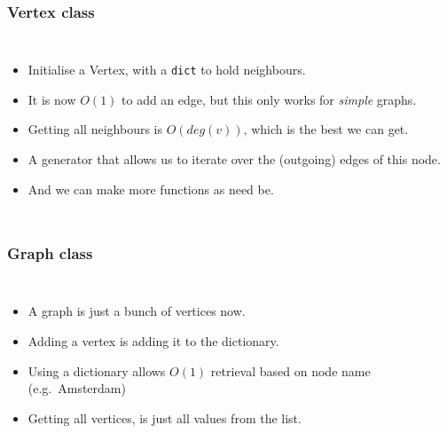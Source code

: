 \begin{frame}
	\frametitle{Vertex class}
	
	\begin{columns}
			
		\begin{itemize}
			\pause
			\item Initialise a Vertex, with a \texttt{dict} to hold neighbours.
				\pause
			\item It is now $O(1)$ to add an edge, but this only works for \textit{simple} graphs.
				\pause
			\item Getting all neighbours is $O(\mathit{deg}(v))$, which is the best we can get.
				\pause
			\item A generator that allows us to iterate over the (outgoing) edges of this node.
				\pause
			\item And we can make more functions as need be.
		\end{itemize}
			
	\end{columns}
\end{frame}

\begin{frame}
	\frametitle{Graph class}
	
	\begin{columns}
		\column{0.505\textwidth}
			
		\column{0.455\textwidth}
		\begin{itemize}
			\pause
			\item A graph is just a bunch of vertices now.
				\pause
			\item Adding a vertex is adding it to the dictionary.
			\item Using a dictionary allows $O(1)$ retrieval based on node name (e.g.\ Amsterdam)
				\pause
			\item Getting all vertices, is just all values from the list.
		\end{itemize}
			
	\end{columns}
\end{frame}

